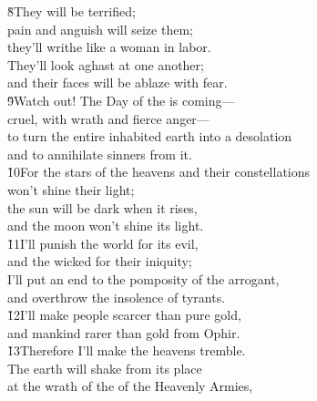 \begin{poetry}
\poeml \v{8}They will be terrified; \\
\poemll    pain and anguish will seize them; \\
\poeml they'll writhe like a woman in labor. \\
\poemll    They'll look aghast at one another; \\
\poemlll       and their faces will be ablaze with fear. \\
\poeml \v{9}Watch out! The Day of the  is coming--- \\
\poemll    cruel, with wrath and fierce anger--- \\
\poeml to turn the entire inhabited earth into a desolation \\
\poemll    and to annihilate sinners from it. \\
\poeml \v{10}For the stars of the heavens and their constellations \\
\poemll    won't shine their light; \\
\poeml the sun will be dark when it rises, \\
\poemll    and the moon won't shine its light. \\
\poeml \v{11}I'll punish the world for its evil, \\
\poemll    and the wicked for their iniquity; \\
\poeml I'll put an end to the pomposity of the arrogant, \\
\poemll    and overthrow the insolence of tyrants. \\
\poeml \v{12}I'll make people scarcer than pure gold, \\
\poemll    and mankind rarer than gold from Ophir. \\
\poeml \v{13}Therefore I'll make the heavens tremble. \\
\poemll    The earth will shake from its place \\
\poeml at the wrath of the  of the Heavenly Armies, \\

\end{poetry}
